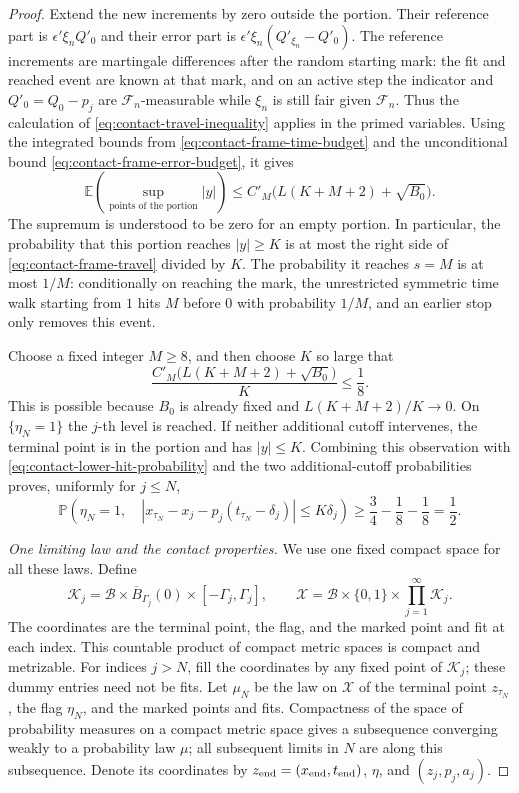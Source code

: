 \begin{proof}
Extend the new increments by zero outside the portion.  Their reference
part is $\epsilon'\xi_nQ'_0$ and their error part is
$\epsilon'\xi_n(Q'_{\xi_n}-Q'_0)$.  The reference increments are martingale
differences after the random starting mark: the fit and reached event are
known at that mark, and on an active step the indicator and
$Q'_0=Q_0-p_j$ are $\mathcal F_n$-measurable while $\xi_n$ is still fair
given $\mathcal F_n$.  Thus the calculation of
\eqref{eq:contact-travel-inequality} applies in the primed variables.  Using
the integrated bounds from
\eqref{eq:contact-frame-time-budget} and the unconditional bound
\eqref{eq:contact-frame-error-budget}, it gives
\begin{equation}\label{eq:contact-frame-travel}
  \mathbb E\left(\sup_{\text{points of the portion}}|y|\right)
   \le C'_M\bigl(L(K+M+2)+\sqrt{B_0}\bigr).
\end{equation}
The supremum is understood to be zero for an empty portion.  In particular,
the probability that this portion reaches $|y|\ge K$ is at most the right
side of \eqref{eq:contact-frame-travel} divided by $K$.  The probability it
reaches $s=M$ is at most $1/M$: conditionally on reaching the mark, the
unrestricted symmetric time walk starting from $1$ hits $M$ before $0$ with
probability $1/M$, and an earlier stop only removes this event.

Choose a fixed integer $M\ge8$, and then choose $K$ so large that
\[
  \frac{C'_M\bigl(L(K+M+2)+\sqrt{B_0}\bigr)}{K}\le\frac18.
\]
This is possible because $B_0$ is already fixed and $L(K+M+2)/K\to0$.
On $\{\eta_N=1\}$ the $j$-th level is reached.  If neither additional
cutoff intervenes, the terminal point is in the portion and has $|y|\le K$.
Combining this observation with \eqref{eq:contact-lower-hit-probability}
and the two additional-cutoff probabilities proves, uniformly for $j\le N$,
\begin{equation}\label{eq:contact-finite-localization}
  \mathbb P\left(\eta_N=1,\quad
      |x_{\tau_N}-x_j-p_j(t_{\tau_N}-\delta_j)|\le K\delta_j\right)
       \ge\frac34-\frac18-\frac18=\frac12.
\end{equation}

\medskip\noindent\emph{One limiting law and the contact properties.}
We use one fixed compact space for all these laws.  Define
\[
  \mathcal K_j=\mathcal B\times\overline B_{\Gamma_j}(0)
                    \times[-\Gamma_j,\Gamma_j],
  \qquad
  \mathcal X=\mathcal B\times\{0,1\}\times\prod_{j=1}^{\infty}\mathcal K_j.
\]
The coordinates are the terminal point, the flag, and the marked point and
fit at each index.  This countable product of compact metric spaces is
compact and metrizable.  For indices $j>N$, fill the coordinates by any
fixed point of $\mathcal K_j$; these dummy entries need not be fits.  Let
$\mu_N$ be the law on $\mathcal X$ of the terminal point $z_{\tau_N}$, the
flag $\eta_N$, and the marked points and fits.  Compactness of the space
of probability measures on a compact metric space gives a subsequence
converging weakly to a probability law $\mu$; all subsequent limits in $N$
are along this subsequence.  Denote its coordinates by
$z_{\rm end}=(x_{\rm end},t_{\rm end})$, $\eta$, and
$(z_j,p_j,a_j)$.


\end{proof}

